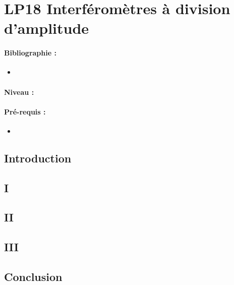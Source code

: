 \section{LP18 Interféromètres à division d'amplitude}

\paragraph{Bibliographie :}
\begin{itemize}
\item 
\end{itemize}

\paragraph{Niveau :} 

\paragraph{Pré-requis :}
\begin{itemize}
\item 
\end{itemize}

\subsection{Introduction}

\subsection{I}

\subsection{II}

\subsection{III}

\subsection{Conclusion}